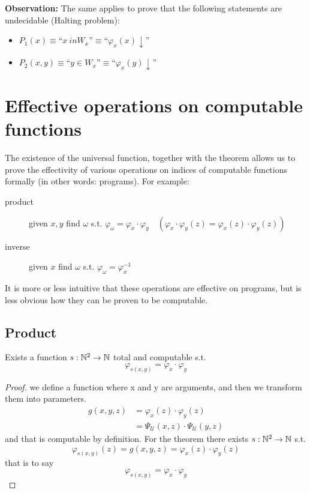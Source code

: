 \textbf{Observation:} The same applies to prove that the following
statements are undecidable (Halting problem):
\begin{itemize}
\item
  $P_1(x) \equiv \mbox{``}x \ in W_x\mbox{''} \equiv
  \mbox{``}\varphi_x(x) \downarrow \mbox{''}$
\item
  $P_2(x,y) \equiv \mbox{``} y \in W_x \mbox{''} \equiv
  \mbox{``}\varphi_x(y) \downarrow\mbox{''}$
\end{itemize}

\section{Effective operations on computable functions}
The existence of the universal function, together with the \smn
theorem allows us to prove the effectivity of various
operations on indices of computable functions formally (in other words:
programs). For example:
\begin{description}
\item[product] given $x,y$ find $\omega$ s.t.
  $\varphi_\omega = \varphi_x \cdot \varphi_y \quad(\varphi_x\cdot
  \varphi_y(z) = \varphi_x(z) \cdot \varphi_y(z))$
\item[inverse] given $x$ find $\omega$ s.t.
  $\varphi_\omega = \varphi_x^{-1}$
\end{description}
It is more or less intuitive that these operations are effective on
programs, but is less obvious how they can be proven to be computable.
\subsection{Product}
Exists a function $s: \mathbb{N}^2 \rightarrow \mathbb{N}$ total and computable
s.t. \[\varphi_{s(x,y)} = \varphi_x \cdot \varphi_y\]
\begin{proof}
  we define a function where x and y are arguments, and then we
  transform them into parameters.
  \[
    \begin{split}
      g(x,y,z) &= \varphi_x(z) \cdot \varphi_y(z) \\
      &= \Psi_{\mathcal{U}}(x,z) \cdot \Psi_{\mathcal{U}}(y,z)
    \end{split}
  \]
  and that is computable by definition. For the \smn theorem there
  exists $s: \mathbb{N}^2 \rightarrow \mathbb{N}$ s.t.
  \[
    \varphi_{s(x,y)}(z) = g(x,y,z) = \varphi_x(z) \cdot \varphi_y(z)
  \]
  that is to say
  \[
    \varphi_{s(x,y)} = \varphi_x \cdot \varphi_y
  \]
\end{proof}

